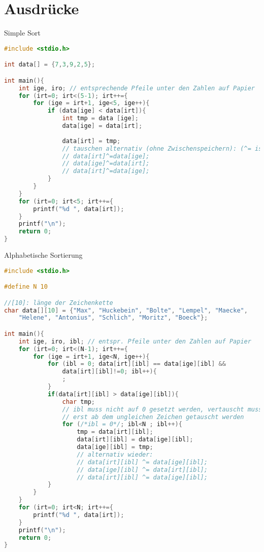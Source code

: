 \section{Ausdrücke}

Simple Sort

\begin{lstlisting}[language=C]
#include <stdio.h>

int data[] = {7,3,9,2,5};

int main(){
	int ige, iro; // entsprechende Pfeile unter den Zahlen auf Papier
	for (irt=0; irt<(5-1); irt++={
		for (ige = irt+1, ige<5, ige++){
			if (data[ige] < data[irt]){
				int tmp = data [ige];
				data[ige] = data[irt];
				
				data[irt] = tmp;
				// tauschen alternativ (ohne Zwischenspeichern): (^= ist XOR)
				// data[irt]^=data[ige];
				// data[ige]^=data[irt];
				// data[irt]^=data[ige];
			}
		}	
	}
	for (irt=0; irt<5; irt++={
		printf("%d ", data[irt]);
	}
	printf("\n");
	return 0;
}
\end{lstlisting}

Alphabetische Sortierung

\begin{lstlisting}[language=C]
#include <stdio.h>

#define N 10

//[10]: länge der Zeichenkette
char data[][10] = {"Max", "Huckebein", "Bolte", "Lempel", "Maecke", 
	"Helene", "Antonius", "Schlich", "Moritz", "Boeck"};

int main(){
	int ige, iro, ibl; // entspr. Pfeile unter den Zahlen auf Papier
	for (irt=0; irt<(N-1); irt++={
		for (ige = irt+1, ige<N, ige++){
			for (ibl = 0; data[irt][ibl] == data[ige][ibl] && 
				data[irt][ibl]!=0; ibl++){
				;
			}
			if(data[irt][ibl] > data[ige][ibl]){
				char tmp;
				// ibl muss nicht auf 0 gesetzt werden, vertauscht muss sowieso
				// erst ab dem ungleichen Zeichen getauscht werden
				for (/*ibl = 0*/; ibl<N ; ibl++){
					tmp = data[irt][ibl];
					data[irt][ibl] = data[ige][ibl];
					data[ige][ibl] = tmp;
					// alternativ wieder:
					// data[irt][ibl] ^= data[ige][ibl];
					// data[ige][ibl] ^= data[irt][ibl];
					// data[irt][ibl] ^= data[ige][ibl];
			}
		}	
	}
	for (irt=0; irt<N; irt++={
		printf("%d ", data[irt]);
	}
	printf("\n");
	return 0;
}
\end{lstlisting}

